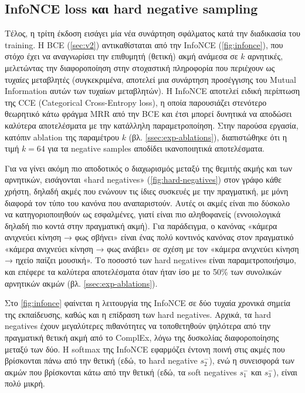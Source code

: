 \subsection{InfoNCE loss και hard negative sampling}\label{ssec:infonce}
Τέλος, η τρίτη έκδοση εισάγει μία νέα συνάρτηση σφάλματος κατά την διαδικασία του training. Η BCE (\autoref{sec:v2}) αντικαθίσταται από την InfoNCE (\autoref{fig:infonce}), που στόχο έχει να αναγνωρίσει την επιθυμητή (θετική) ακμή ανάμεσα σε $k$ αρνητικές, μελετώντας την διαφοροποίηση στην στοχαστική πληροφορία που περιέχουν ως τυχαίες μεταβλητές (συγκεκριμένα, αποτελεί μια συνάρτηση προσέγγισης του Mutual Information \cite{oord_representation_2018, cover_elements_2006} αυτών των τυχαίων μεταβλητών). Η InfoNCE αποτελεί ειδική περίπτωση της CCE (Categorical Cross-Entropy loss), η οποία παρουσιάζει στενότερο θεωρητικό κάτω φράγμα MRR από την BCE \cite{diteodoro_theoretical_2024} και έτσι μπορεί δυνητικά να αποδώσει καλύτερα αποτελέσματα με την κατάλληλη παραμετροποίηση. Στην παρούσα εργασία, κατόπιν ablation της παραμέτρου $k$ (βλ. \autoref{ssec:exp-ablations}), διαπιστώθηκε ότι η τιμή $k=64$ για τα negative samples αποδίδει ικανοποιητικά αποτελέσματα.

Για να γίνει ακόμη πιο αποδοτικός ο διαχωρισμός μεταξύ της θεμιτής ακμής και των αρνητικών, εισάγονται «hard negatives» (\autoref{fig:hard-negatives}) στον γράφο κάθε χρήστη, δηλαδή ακμές που ενώνουν τις ίδιες συσκευές με την πραγματική, με μόνη διαφορά τον τύπο του κανόνα που αναπαριστούν. Αυτές οι ακμές είναι πιο δύσκολο να κατηγοριοποιηθούν ως εσφαλμένες, γιατί είναι πιο αληθοφανείς (εννοιολογικά δηλαδή πιο κοντά στην πραγματική ακμή). Για παράδειγμα, ο κανόνας «κάμερα ανιχνεύει κίνηση → φως σβήνει» είναι ένας πολύ κοντινός κανόνας στον πραγματικό «κάμερα ανιχνεύει κίνηση → φως ανάβει» σε σχέση με τον «κάμερα ανιχνεύει κίνηση → ηχείο παίζει μουσική». Το ποσοστό των hard negatives είναι παραμετροποιήσιμο, και επέφερε τα καλύτερα αποτελέσματα όταν ήταν ίσο με το 50\% των συνολικών αρνητικών ακμών (βλ. \autoref{ssec:exp-ablations}).

Στο \autoref{fig:infonce} φαίνεται η λειτουργία της InfoNCE σε δύο τυχαία χρονικά σημεία της εκπαίδευσης, καθώς και η επίδραση των hard negatives. Αρχικά, τα hard negatives έχουν μεγαλύτερες πιθανότητες να τοποθετηθούν ψηλότερα από την πραγματική θετική ακμή από το ComplEx, λόγω της δυσκολίας διαφοροποίησης μεταξύ των δύο. Η softmax της InfoNCE εφαρμόζει έντονη ποινή στις ακμές που βρίσκονται πάνω από την θετική (εδώ, το hard negative $s^-_2$), ενώ η συνεισφορά των ακμών που βρίσκονται κάτω από την θετική (εδώ, τα soft negatives $s^-_1$ και $s^-_3$), είναι πολύ μικρή.

